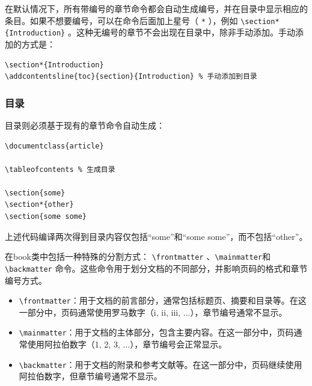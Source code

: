 在默认情况下，所有带编号的章节命令都会自动生成编号，并在目录中显示相应的条目。如果不想要编号，可以在命令后面加上星号（ \verb|*| ），例如 \verb|\section*{Introduction}| 。这种无编号的章节不会出现在目录中，除非手动添加。手动添加的方式是：
\begin{verbatim}
\section*{Introduction}
\addcontentsline{toc}{section}{Introduction} % 手动添加到目录
\end{verbatim}

\subsubsection{目录}

目录则必须基于现有的章节命令自动生成：
\begin{verbatim}
\documentclass{article}

\tableofcontents % 生成目录

\section{some}
\section*{other}
\section{some some}

\end{verbatim}
上述代码编译两次得到目录内容仅包括“some”和“some some”，而不包括“other”。

在book类中包括一种特殊的分割方式： \verb|\frontmatter| 、\verb|\mainmatter|和 \verb|\backmatter| 命令。这些命令用于划分文档的不同部分，并影响页码的格式和章节编号方式。
\begin{itemize}
  \item \verb|\frontmatter|：用于文档的前言部分，通常包括标题页、摘要和目录等。在这一部分中，页码通常使用罗马数字（i, ii, iii, ...），章节编号通常不显示。
  \item \verb|\mainmatter|：用于文档的主体部分，包含主要内容。在这一部分中，页码通常使用阿拉伯数字（1, 2, 3, ...），章节编号会正常显示。
  \item \verb|\backmatter|：用于文档的附录和参考文献等。在这一部分中，页码继续使用阿拉伯数字，但章节编号通常不显示。
\end{itemize}

